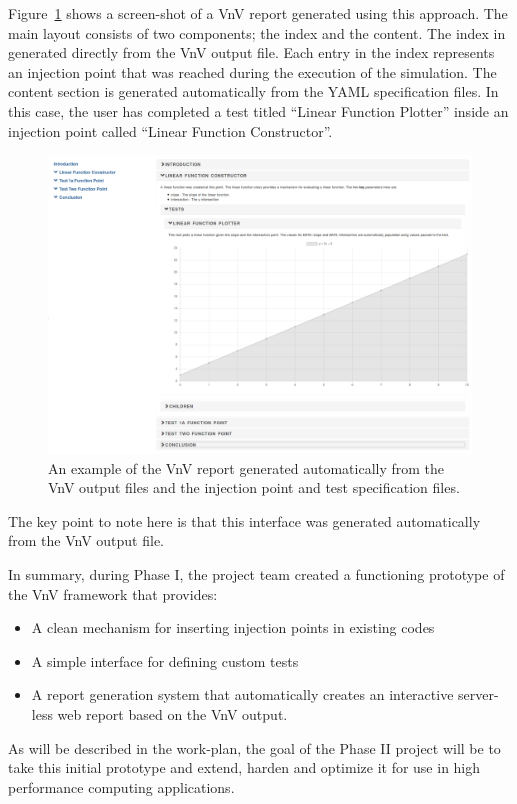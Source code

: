 Figure~\ref{rendered-example} shows a screen-shot of a VnV report generated using this approach. The main layout consists of two components; the index and the content. The index in generated directly from the VnV output file. Each entry in the index represents an injection point that was reached during the execution of the simulation. The content section is generated automatically from the YAML specification files. In this case, the user has completed a test titled ``Linear Function Plotter'' inside an injection point called ``Linear Function Constructor''.  

\begin{figure}
\centering
 \includegraphics[width=\textwidth]{./narrative/figures/render-example.PNG}
\caption{ An example of the VnV report generated automatically from the VnV output files and the injection point and test specification files. \label{rendered-example}}
\end{figure}
 
The key point to note here is that this interface was generated automatically from the VnV output file.

In summary, during Phase I, the project team created a functioning prototype of the VnV framework that provides:
\begin{itemize}
 \item A clean mechanism for inserting injection points in existing codes
 \item A simple interface for defining custom tests 
 \item A report generation system that automatically creates an interactive server-less web report based on the VnV output.
\end{itemize}

As will be described in the work-plan, the goal of the Phase II project will be to take this initial prototype and extend, harden and 
optimize it for use in high performance computing applications. 





























